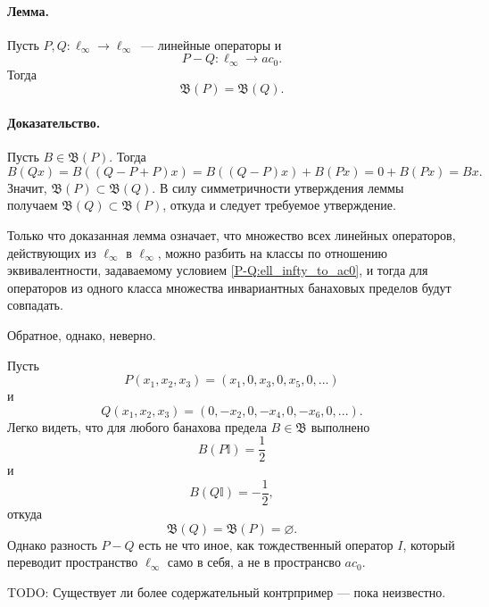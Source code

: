 \paragraph{Лемма.}

Пусть $P,Q:\ell_\infty \to \ell_\infty$~--- линейные операторы и
\begin{equation}\label{P-Q:ell_infty_to_ac0}
	P-Q : \ell_\infty \to ac_0
	.
\end{equation}
Тогда
\begin{equation}
	\mathfrak{B}(P)=\mathfrak{B}(Q)
	.
\end{equation}

\paragraph{Доказательство.}
Пусть $B\in \mathfrak{B}(P)$.
Тогда
\begin{equation}
	B(Qx) = B((Q-P+P)x) =
	B((Q-P)x)+B(Px) =
	0 + B(Px) =
	Bx
	.
\end{equation}
Значит, $\mathfrak{B}(P) \subset \mathfrak{B}(Q)$.
В силу симметричности утверждения леммы получаем $\mathfrak{B}(Q) \subset \mathfrak{B}(P)$,
откуда и следует требуемое утверждение.

Только что доказанная лемма означает, что множество всех линейных операторов,
действующих из $\ell_\infty$ в $\ell_\infty$, можно разбить на классы по отношению эквивалентности,
задаваемому условием \eqref{P-Q:ell_infty_to_ac0},
и тогда для операторов из одного класса множества инвариантных банаховых пределов будут совпадать.

Обратное, однако, неверно.

\begin{example}
	Пусть
	\begin{equation}
		P(x_1,x_2,x_3) = (x_1, 0, x_3, 0, x_5, 0, ...)
	\end{equation}
	и
	\begin{equation}
		Q(x_1,x_2,x_3) = (0, -x_2, 0, -x_4, 0, -x_6, 0, ...)
		.
	\end{equation}
	Легко видеть, что для любого банахова предела $B\in\mathfrak{B}$ выполнено
	\begin{equation}
		B(P\mathbb{I}) = \frac{1}{2}
	\end{equation}
	и
	\begin{equation}
		B(Q\mathbb{I}) = -\frac{1}{2}
		,
	\end{equation}
	откуда
	\begin{equation}
		\mathfrak{B}(Q) = \mathfrak{B}(P) = \varnothing
		.
	\end{equation}
	Однако разность $P-Q$ есть не что иное, как тождественный оператор $I$,
	который переводит пространство $\ell_\infty$ само в себя,
	а не в пространсво $ac_0$.
\end{example}


TODO:
Существует ли более содержательный контрпример --- пока неизвестно.


